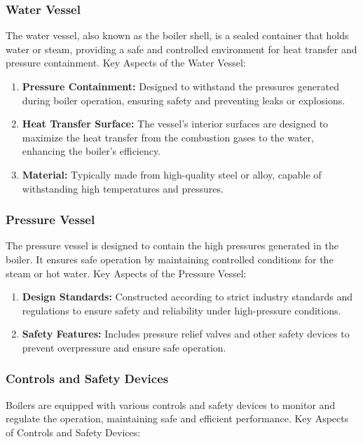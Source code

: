 \subsubsection{Water Vessel}
The water vessel, also known as the boiler shell, is a sealed container that holds water or steam, providing a safe and controlled environment for heat transfer and pressure containment.
Key Aspects of the Water Vessel:
\begin{enumerate}
    \item \textbf{Pressure Containment:} Designed to withstand the pressures generated during boiler operation, ensuring safety and preventing leaks or explosions.
    \item \textbf{Heat Transfer Surface:} The vessel's interior surfaces are designed to maximize the heat transfer from the combustion gases to the water, enhancing the boiler's efficiency.
    \item \textbf{Material:} Typically made from high-quality steel or alloy, capable of withstanding high temperatures and pressures.
\end{enumerate}

\subsubsection{Pressure Vessel}
The pressure vessel is designed to contain the high pressures generated in the boiler. It ensures safe operation by maintaining controlled conditions for the steam or hot water.
Key Aspects of the Pressure Vessel:
\begin{enumerate}
    \item \textbf{Design Standards:} Constructed according to strict industry standards and regulations to ensure safety and reliability under high-pressure conditions.
    \item \textbf{Safety Features:} Includes pressure relief valves and other safety devices to prevent overpressure and ensure safe operation.
\end{enumerate}

\subsubsection{Controls and Safety Devices}
Boilers are equipped with various controls and safety devices to monitor and regulate the operation, maintaining safe and efficient performance.
Key Aspects of Controls and Safety Devices:

